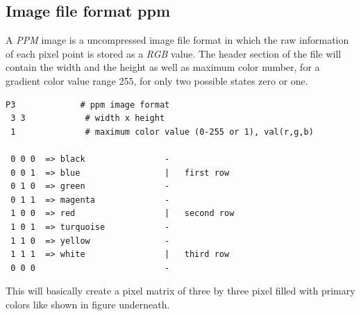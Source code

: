 \newpage

\subsection{Image file format ppm} \label{subsection:ppm}

A \textit{PPM} image is a uncompressed image file format in which the raw information of each pixel point is stored as a \textit{RGB} value. The header section of the file will contain the width and the height as well as maximum color number, for a gradient color value range 255, for only two possible states zero or one.

\begin{lstlisting}[caption=Simple example for an ppm image file format]
 P3				# ppm image format
 3 3			# width x height
 1				# maximum color value (0-255 or 1), val(r,g,b)

 0 0 0	=> black				-
 0 0 1	=> blue					|	first row
 0 1 0	=> green				-
 0 1 1	=> magenta				-
 1 0 0	=> red					|	second row
 1 0 1	=> turquoise			-
 1 1 0	=> yellow				-
 1 1 1	=> white				|	third row
 0 0 0 							-
\end{lstlisting}

This will basically create a pixel matrix of three by three pixel filled with primary colors like shown in figure underneath.

